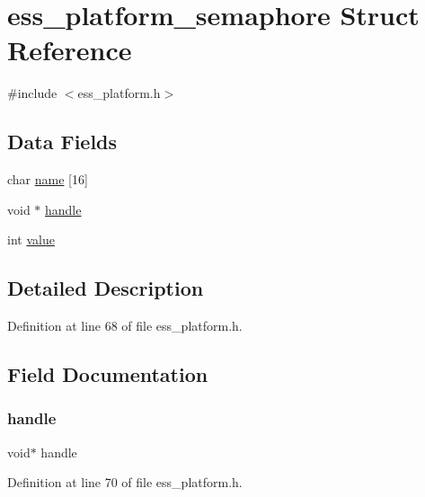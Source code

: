 \hypertarget{structess__platform__semaphore}{}\section{ess\+\_\+platform\+\_\+semaphore Struct Reference}
\label{structess__platform__semaphore}


{\ttfamily \#include $<$ess\+\_\+platform.\+h$>$}

\subsection*{Data Fields}
\begin{DoxyCompactItemize}
\item 
char \hyperlink{structess__platform__semaphore_acd328517a6cf718155c2e6e22b671ca9}{name} \mbox{[}16\mbox{]}
\item 
void $\ast$ \hyperlink{structess__platform__semaphore_a81011b79683fab64ce3aff71114f8fdd}{handle}
\item 
int \hyperlink{structess__platform__semaphore_ac4f474c82e82cbb89ca7c36dd52be0ed}{value}
\end{DoxyCompactItemize}


\subsection{Detailed Description}


Definition at line 68 of file ess\+\_\+platform.\+h.



\subsection{Field Documentation}
\mbox{\label{structess__platform__semaphore_a81011b79683fab64ce3aff71114f8fdd}} 
\subsubsection{\texorpdfstring{handle}{handle}}
{\footnotesize\ttfamily void$\ast$ handle}



Definition at line 70 of file ess\+\_\+platform.\+h.

